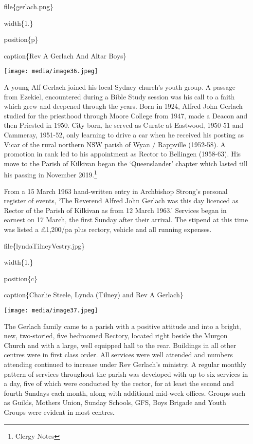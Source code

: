 file\{gerlach.png\}

width\{1.\}

position\{p\}

caption\{Rev A Gerlach And Altar Boys\}

\texttt{[image: media/image36.jpeg]}

A young Alf Gerlach joined his local Sydney church's youth group. A passage from Ezekiel, encountered during a Bible Study session was his call to a faith which grew and deepened through the years. Born in 1924, Alfred John Gerlach studied for the priesthood through Moore College from 1947, made a Deacon and then Priested in 1950. City born, he served as Curate at Eastwood, 1950-51 and Cammeray, 1951-52, only learning to drive a car when he received his posting as Vicar of the rural northern NSW parish of Wyan / Rappville (1952-58). A promotion in rank led to his appointment as Rector to Bellingen (1958-63). His move to the Parish of Kilkivan began the `Queenslander' chapter which lasted till his passing in November 2019.\footnote{Clergy Notes}

From a 15 March 1963 hand-written entry in Archbishop Strong's personal register of events, `The Reverend Alfred John Gerlach was this day licenced as Rector of the Parish of Kilkivan as from 12 March 1963.' Services began in earnest on 17 March, the first Sunday after their arrival. The stipend at this time was listed a £1,200/pa plus rectory, vehicle and all running expenses.

file\{lyndaTilneyVestry.jpg\}

width\{1.\}

position\{c\}

caption\{Charlie Steele, Lynda (Tilney) and Rev A Gerlach\}

\texttt{[image: media/image37.jpeg]}

The Gerlach family came to a parish with a positive attitude and into a bright, new, two-storied, five bedroomed Rectory, located right beside the Murgon Church and with a large, well equipped hall to the rear. Buildings in all other centres were in first class order. All services were well attended and numbers attending continued to increase under Rev Gerlach's ministry. A regular monthly pattern of services throughout the parish was developed with up to six services in a day, five of which were conducted by the rector, for at least the second and fourth Sundays each month, along with additional mid-week offices. Groups such as Guilds, Mothers Union, Sunday Schools, GFS, Boys Brigade and Youth Groups were evident in most centres.

